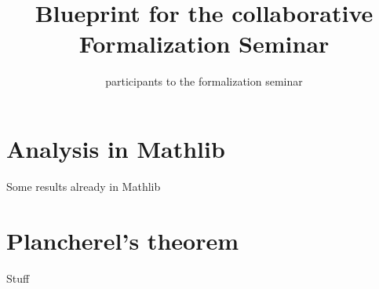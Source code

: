 
\title{Blueprint for the collaborative Formalization Seminar}

\author{participants to the formalization seminar}

\maketitle

\tableofcontents

\chapter{Analysis in Mathlib}

Some results already in Mathlib

\chapter{Plancherel's theorem}

Stuff